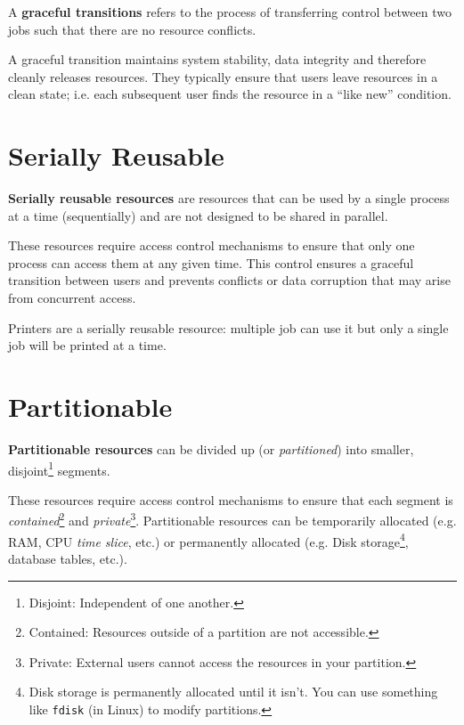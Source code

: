 \documentclass{report}
\begin{document}
\begin{tcolorbox}[title=Definition: Graceful Transition]
  A \textbf{graceful transitions} refers to the process of transferring control between two jobs
  such that there are no resource conflicts. 
\end{tcolorbox}

A graceful transition maintains system stability, data integrity and therefore cleanly releases
resources. They typically ensure that users leave resources in a clean state; i.e. each
subsequent user finds the resource in a ``like new'' condition.


\section{Serially Reusable}
\begin{tcolorbox}[title=Definition: Serially Reusable Resource]
  \textbf{Serially reusable resources} are resources that can be used by a single process at a time
  (sequentially) and are not designed to be shared in parallel.
\end{tcolorbox}

These resources require access control mechanisms to ensure that only one process can access them at
any given time. This control ensures a graceful transition between users and prevents conflicts or
data corruption that may arise from concurrent access.

\begin{tcolorbox}[colback=blue!5!white,colframe=black!75!blue,title=Example: Printing Process]
  Printers are a serially reusable resource: multiple job can use it but only a single job will be
  printed at a time. 
\end{tcolorbox}

\section{Partitionable}
\begin{tcolorbox}[title=Definition: Partitionable Resource]
  \textbf{Partitionable resources} can be divided up (or \textit{partitioned}) into smaller,
  disjoint\footnote{Disjoint: Independent of one another.} segments.  
\end{tcolorbox}

These resources require access control mechanisms to ensure that each segment is
\textit{contained}\footnote{Contained: Resources outside of a partition are not accessible.} and
\textit{private}\footnote{Private: External users cannot access the resources in your
  partition.}. Partitionable resources can be temporarily allocated (e.g. RAM, CPU \textit{time
  slice}, etc.) or permanently allocated (e.g. Disk
storage\footnote{Disk storage is permanently allocated until it isn't. You can use something like
  \texttt{fdisk} (in Linux) to modify partitions.}, database tables, etc.).
\end{document}

